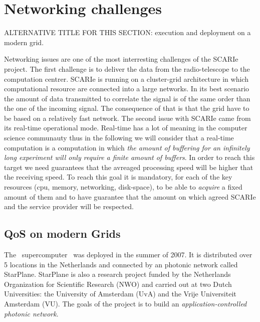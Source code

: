 \section{Networking challenges}
ALTERNATIVE TITLE FOR THIS SECTION: execution and deployment on a modern grid.

Networking issues are one of the most interresting challenges 
of the SCARIe project. The first challenge is to deliver the 
data from the radio-telescope to the computation centrer. SCARIe
is running on a cluster-grid architecture in which computational 
resource are connected into a large networks. In its best scenario 
the amount of data transmitted to correlate the signal is of the same 
order than the one of the incoming signal. The consequence of that is that 
the grid have to be based on a relatively fast network. The second issue 
with SCARIe came from its real-time operational mode. Real-time has a lot 
of meaning in the computer science communauty thus in the following 
we will consider that a real-time computation is a computation in which 
\emph{the amount of buffering for an infinitely long experiment will only require 
a finite amount of buffers}. In order to reach this target we need guarantees 
that the avreaged processing speed will be higher that the receiving speed. 
To reach this goal it is mandatory, for each of the key resources (cpu, 
memory, networking, disk-space), to be able to \emph{acquire} a fixed 
amount of them and to have guarantee that the amount on which agreed 
SCARIe and the service provider will be respected. 

\subsection{QoS on modern Grids}
The \ supercomputer~\cite{das3} was deployed in the summer of
2007. It is distributed over 5 locations in the Netherlands and
connected by an photonic network called StarPlane. StarPlane is also a
research project funded by the Netherlands Organization for Scientific
Research (NWO) and carried out at two Dutch Universities: the
University of Amsterdam (UvA) and the Vrije Universiteit Amsterdam
(VU). The goals of the project is to build an
\textit{application-controlled photonic network}. 

